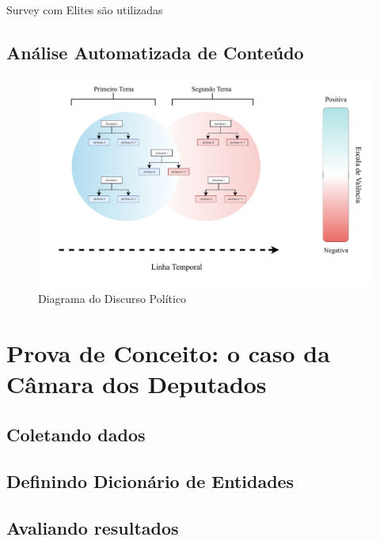 \documentclass[
12pt,				%
openright,			%
twoside,			%
a4paper,			%
english,			%
french,				%
spanish,			%
brazil				%
]{abntex2}
\begin{document}
Survey com Elites são utilizadas


\section{Análise Automatizada de Conteúdo}

\begin{figure}[h]
	\caption{Diagrama do Discurso Político}
	\label{fig:diagrama}
	\centering
	\includegraphics[width=1\linewidth]{figures/diagrama_discurso_autoritario}
\end{figure}

\chapter{Prova de Conceito: o caso da Câmara dos Deputados}\label{resultados}

\section{Coletando dados}

\section{Definindo Dicionário de Entidades}

\section{Avaliando resultados}		
\postextual
\end{document}
